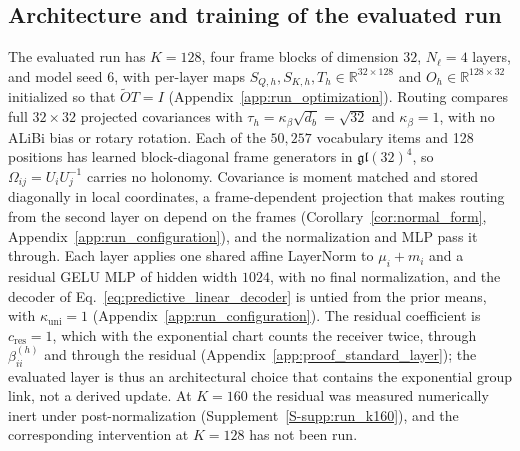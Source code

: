 \documentclass[twoside,11pt]{article}
\begin{document}
\subsection{Architecture and training of the evaluated run}
\label{sec:relational_run}

The evaluated run has $K=128$, four frame blocks of dimension $32$, $N_\ell=4$ layers, and model seed 6, %
with per-layer maps $S_{Q,h},S_{K,h},T_h\in\mathbb R^{32\times128}$ and $O_h\in\mathbb R^{128\times32}$ initialized so that $\widetilde OT=I$ (Appendix~\ref{app:run_optimization}). %
Routing compares full $32\times32$ projected covariances with $\tau_h=\kappa_\beta\sqrt{d_b}=\sqrt{32}$ and $\kappa_\beta=1$, %
with no ALiBi bias \citep{press2022train} or rotary rotation. %
Each of the $50{,}257$ vocabulary items and 128 positions has learned block-diagonal frame generators in $\mathfrak{gl}(32)^4$, so $\Omega_{ij}=U_iU_j^{-1}$ carries no holonomy. Covariance is moment matched and stored diagonally in local coordinates, a frame-dependent projection that makes routing from the second layer on depend on the frames (Corollary~\ref{cor:normal_form}, Appendix~\ref{app:run_configuration}), and the normalization and MLP pass it through. %
Each layer applies one shared affine LayerNorm \citep{ba2016layernorm} to $\mu_i+m_i$ and a residual GELU MLP \citep{hendrycks2016gaussian} of hidden width $1024$, with no final normalization, %
and the decoder of Eq.~\eqref{eq:predictive_linear_decoder} is untied from the prior means, with $\kappa_{\mathrm{uni}}=1$ (Appendix~\ref{app:run_configuration}). %
The residual coefficient is $c_{\mathrm{res}}=1$, %
which with the exponential chart counts the receiver twice, through $\beta_{ii}^{(h)}$ and through the residual (Appendix~\ref{app:proof_standard_layer}); the evaluated layer is thus an architectural choice that contains the exponential group link, not a derived update. At $K=160$ the residual was measured numerically inert under post-normalization (Supplement~\ref{S-supp:run_k160}), and the corresponding intervention at $K=128$ has not been run.
\end{document}
